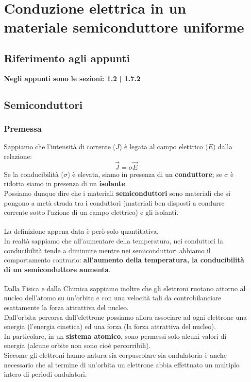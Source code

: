 \documentclass{article}
\numberwithin{equation}{subsection}
\begin{document}
	\section{Conduzione elettrica in un materiale semiconduttore uniforme}
	\subsection{Riferimento agli appunti}
	\textbf{Negli appunti sono le sezioni: 1.2 | 1.7.2}
	\subsection{Semiconduttori}
	\subsubsection{Premessa}
	Sappiamo che l’intensità di corrente ($J$) è legata al campo elettrico ($E$) dalla relazione:
	$$\vec{J} = \sigma \vec{E}$$
	Se la conducibilità ($\sigma$) è elevata, siamo in presenza di un \textbf{conduttore}; se $\sigma$ è ridotta siamo in presenza di un \textbf{isolante}.\\
	Possiamo dunque dire che i materiali \textbf{semiconduttori} sono materiali che si pongono a metà strada tra i conduttori (materiali ben disposti a condurre corrente sotto l’azione di un campo elettrico) e gli isolanti.\\\\
	La definizione appena data è però solo quantitativa. \\
	In realtà sappiamo che all’aumentare della temperatura, nei conduttori la conducibilità tende a diminuire mentre nei semiconduttori abbiamo il comportamento contrario: \textbf{all’aumento della temperatura, la conducibilità di un semiconduttore aumenta}.\\\\
	Dalla Fisica e dalla Chimica sappiamo inoltre che gli elettroni ruotano attorno al nucleo dell’atomo su un’orbita e con una velocità tali da controbilanciare esattamente la forza attrattiva del nucleo.\\
	Dall’orbita percorsa dall’elettrone possiamo allora associare ad ogni elettrone una energia (l’energia cinetica) ed una forza (la forza attrattiva del nucleo).\\
	In particolare, in un \textbf{sistema atomico}, sono permessi solo alcuni valori di energia (alcune orbite non sono cioè percorribili).\\
	Siccome gli elettroni hanno natura sia corpuscolare sia ondulatoria è anche necessario che al termine di un’orbita un elettrone abbia effettuato un multiplo intero di periodi ondulatori.
\end{document}
